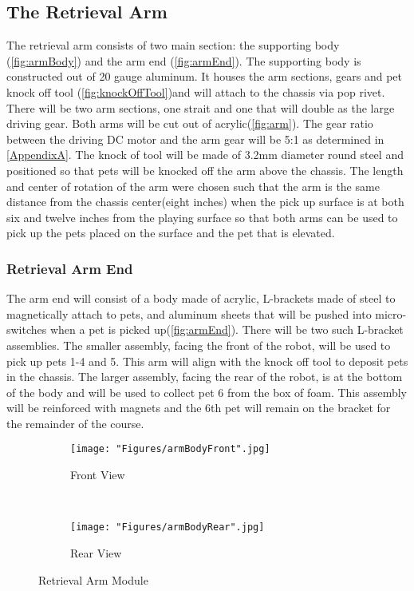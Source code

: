 \documentclass[11pt, oneside]{article} %
\begin{document}
	\newpage	
	\subsection{The Retrieval Arm}
	The retrieval arm consists of two main section: the supporting body (\autoref{fig:armBody}) and the arm end (\autoref{fig:armEnd}). The supporting body is constructed out of 20 gauge aluminum. It houses the arm sections, gears and pet knock off tool (\autoref{fig:knockOffTool})and will attach to the chassis via pop rivet. There will be two arm sections, one strait and one that will double as the large driving gear. Both arms will be cut out of acrylic(\autoref{fig:arm}). The gear ratio between the driving DC motor and the arm gear will be 5:1 as determined in \autoref{AppendixA}. The knock of tool will be made of 3.2mm diameter round steel and positioned so that pets will be knocked off the arm above the chassis. The length and center of rotation of the arm were chosen such that the arm is the same distance from the chassis center(eight inches) when the pick up surface is at both six and twelve inches from the playing surface so that both arms can be used to pick up the pets placed on the surface and the pet that is elevated.
	
		\subsubsection{Retrieval Arm End}
		The arm end will consist of a body made of acrylic, L-brackets made of steel to magnetically attach to pets, and aluminum sheets that will be pushed into micro-switches when a pet is picked up(\autoref{fig:armEnd}). There will be two such L-bracket assemblies. The smaller assembly, facing the front of the robot, will be used to pick up pets 1-4 and 5. This arm will align with the knock off tool to deposit pets in the chassis. The larger assembly, facing the rear of the robot, is at the bottom of the body and will be used to collect pet 6 from the box of foam. This assembly will be reinforced with magnets and the 6th pet will remain on the bracket for the remainder of the course.
		
	\begin{figure}[h]
		\centering
		\begin{subfigure}[b]{0.4\textwidth}
			\centering
			\texttt{[image: "Figures/armBodyFront".jpg]}
			\caption{Front View}
		\end{subfigure}
		~
		\begin{subfigure}[b]{0.5\textwidth}
			\centering
			\texttt{[image: "Figures/armBodyRear".jpg]}
			\caption{Rear View}
		\end{subfigure}
		\caption[Retrieval Arm Module]{Retrieval Arm Module}
		\label{fig:armBody}
	\end{figure}
		
\end{document}
